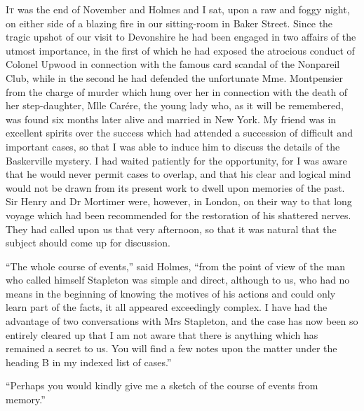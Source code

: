 \documentclass[paper=5.5in:8.5in,BCOR=7mm,twoside,DIV=calc,12pt,usegeometry,openany,chapterprefix,endperiod,headings=big]{scrbook} %
\begin{document}
\lettrine[lines=1]{I}{t} was the end of November and Holmes and I sat, upon a raw and foggy night, on either side of a blazing fire in our sitting-room in Baker Street. Since the tragic upshot of our visit to Devonshire he had been engaged in two affairs of the utmost importance, in the first of which he had exposed the atrocious conduct of Colonel Upwood in connection with the famous card scandal of the Nonpareil Club, while in the second he had defended the unfortunate Mme. Montpensier from the charge of murder which hung over her in connection with the death of her step-daughter, Mlle Carére, the young lady who, as it will be re\-mem\-bered, was found six months later alive and married in New York. My friend was in excellent spirits over the success which had attended a succession of difficult and important cases, so that I was able to induce him to discuss the details of the Baskerville mystery. I had waited patiently for the opportunity, for I was aware that he would never permit cases to overlap, and that his clear and logical mind would not be drawn from its present work to dwell upon memories of the past. Sir Henry and Dr Mortimer were, however, in London, on their way to that long voyage which had been recommended for the restoration of his shattered nerves. They had called upon us that very afternoon, so that it was natural that the subject should come up for discussion.



\enquote{The whole course of events,} said Holmes, \enquote{from the point of view of the man who called himself Stapleton was simple and direct, although to us, who had no means in the beginning of knowing the motives of his actions and could only learn part of the facts, it all appeared exceedingly complex. I have had the advantage of two conversations with Mrs Stapleton, and the case has now been so entirely cleared up that I am not aware that there is anything which has remained a secret to us. You will find a few notes upon the matter under the heading B in my indexed list of cases.}

\enquote{Perhaps you would kindly give me a sketch of the course of events from memory.}
\end{document}
